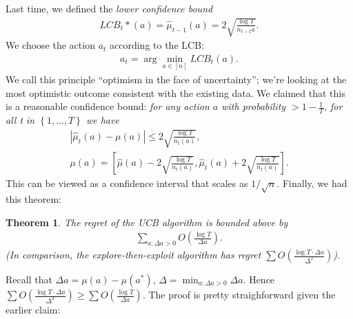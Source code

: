 \documentclass[11pt]{article}
\newtheorem{thm}{Theorem}
\begin{document}
Last time, we defined the \textit{lower confidence bound}
\begin{align*}
  LCB_t*(a) = \hat \mu_{t - 1}(a) = 2\sqrt{\frac{\log T}{n_{t - 1}a}}.
\end{align*}
We choose the action $a_t$ according to the LCB:
\begin{align*}
  a_t = \arg \min_{a \in [n]} LCB_t(a).
\end{align*}
We call this principle ``optimism in the face of uncertainty'';
we're looking at the most optimistic outcome consistent with the existing data.
We claimed that this is a reasonable confidence bound:
\textit{for any action $a$ with probability $> 1 - \frac{1}{T}$, 
for all t in $\left\{ 1, \dots, T \right\}$ we have 
\begin{align*}
  |\hat \mu_t(a) - \mu(a)| \leq 2\sqrt{\frac{\log T}{n_t(a)}}, \\
  \mu(a) = \left[ \hat \mu(a) - 2\sqrt{\frac{\log T}{n_t (a)}}, \hat \mu_t(a) + 2 \sqrt{\frac{\log T}{n_t(a)}} \right].
\end{align*}
}
This can be viewed as a confidence interval that scales as $1/\sqrt{n}$.
Finally, we had this theorem:
\begin{thm}
  The regret of the UCB algorithm is bounded above by
  \begin{align*}
    \sum_{a : \Delta a > 0} O\left( \frac{\log T}{\Delta a} \right).
  \end{align*}
  (In comparison, the explore-then-exploit algorithm has regret $\sum O\left( \frac{\log T \cdot \Delta a}{\Delta^2} \right)$).
\end{thm}
Recall that $\Delta a = \mu(a) - \mu(a^*)$, $\Delta = \min_{a : \Delta a > 0}\Delta a$. 
Hence $\sum O\left( \frac{\log T \cdot \Delta a}{\Delta^2} \right) \geq \sum O\left( \frac{\log T}{\Delta a} \right)$.
The proof is pretty straighforward given the earlier claim:
\end{document}
